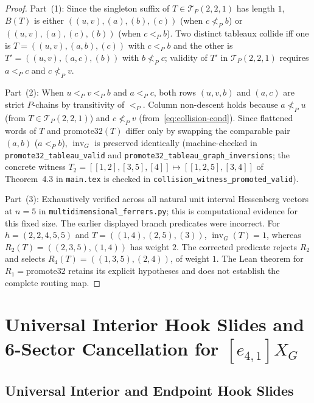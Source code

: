 \documentclass[11pt]{article}
\theoremstyle{definition}
\newcommand{\invG}{\operatorname{inv}_G}
\newcommand{\TP}{\mathcal{T}_P}
\begin{document}
\begin{proof}
Part~(1): Since the singleton suffix of $T \in \TP(2,2,1)$ has length $1$, $B(T)$ is either $((u,v),(a),(b),(c))$ (when $c \not<_P b$) or $((u,v),(a),(c),(b))$ (when $c <_P b$). Two distinct tableaux collide iff one is $T = ((u,v),(a,b),(c))$ with $c <_P b$ and the other is $T' = ((u,v),(a,c),(b))$ with $b \not<_P c$; validity of $T'$ in $\TP(2,2,1)$ requires $a <_P c$ and $c \not<_P v$.

Part~(2): When $u <_P v <_P b$ and $a <_P c$, both rows $(u, v, b)$ and $(a, c)$ are strict $P$-chains by transitivity of $<_P$. Column non-descent holds because $a \not<_P u$ (from $T \in \TP(2,2,1)$) and $c \not<_P v$ (from~\eqref{eq:collision-cond}). Since flattened words of $T$ and $\mathrm{promote32}(T)$ differ only by swapping the comparable pair $(a, b)$ ($a <_P b$), $\invG$ is preserved identically (machine-checked in \nolinkurl{promote32_tableau_valid} and \nolinkurl{promote32_tableau_graph_inversions}; the concrete witness $T_2 = [[1,2],[3,5],[4]] \mapsto [[1,2,5],[3,4]]$ of Theorem~4.3 in \texttt{main.tex} is checked in \nolinkurl{collision_witness_promoted_valid}).

Part~(3): Exhaustively verified across all natural unit interval Hessenberg vectors at $n=5$ in \nolinkurl{multidimensional_ferrers.py}; this is computational evidence for this fixed size. The earlier displayed branch predicates were incorrect. For $h=(2,2,4,5,5)$ and $T=((1,4),(2,5),(3))$, $\invG(T)=1$, whereas $R_2(T)=((2,3,5),(1,4))$ has weight $2$. The corrected predicate rejects $R_2$ and selects $R_4(T)=((1,3,5),(2,4))$, of weight $1$. The Lean theorem for $R_1=\mathrm{promote32}$ retains its explicit hypotheses and does not establish the complete routing map.
\end{proof}

\section{Universal Interior Hook Slides and 6-Sector Cancellation for $[e_{4,1}] X_G$}

\subsection{Universal Interior and Endpoint Hook Slides}
\end{document}
